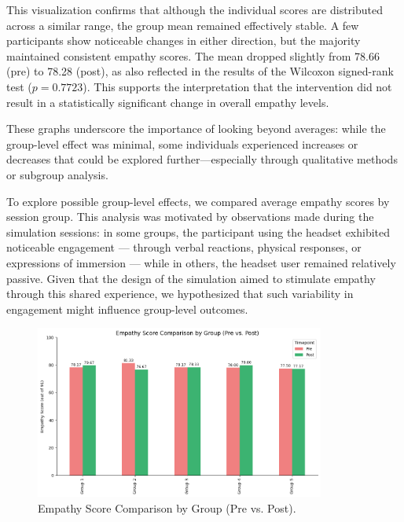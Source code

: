 This visualization confirms that although the individual scores are distributed across a similar range, the group mean remained effectively stable. A few participants show noticeable changes in either direction, but the majority maintained consistent empathy scores. The mean dropped slightly from 78.66 (pre) to 78.28 (post), as also reflected in the results of the Wilcoxon signed-rank test ($p = 0.7723$). This supports the interpretation that the intervention did not result in a statistically significant change in overall empathy levels.

\vspace{1em}

These graphs underscore the importance of looking beyond averages: while the group-level effect was minimal, some individuals experienced increases or decreases that could be explored further—especially through qualitative methods or subgroup analysis.

To explore possible group-level effects, we compared average empathy scores by session group. This analysis was motivated by observations made during the simulation sessions: in some groups, the participant using the headset exhibited noticeable engagement — through verbal reactions, physical responses, or expressions of immersion — while in others, the headset user remained relatively passive. Given that the design of the simulation aimed to stimulate empathy through this shared experience, we hypothesized that such variability in engagement might influence group-level outcomes.


\begin{figure}[htbp]
    \centering
    \includegraphics[width=0.85\textwidth]{../../Figures/emph-scores-comp-grp.png}
    \caption{Empathy Score Comparison by Group (Pre vs. Post).}
    \label{fig:empathy_group_bar}
\end{figure}

